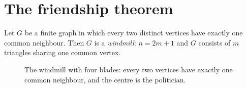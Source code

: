 \section{The friendship theorem}

\begin{theorem}\label{thm:friendship}
Let $G$ be a finite graph in which every two distinct vertices have exactly one common neighbour. Then $G$ is a
\emph{windmill}: $n=2m+1$ and $G$ consists of $m$ triangles sharing one common vertex.
\end{theorem}

\begin{figure}[ht]
\centering
{}
\caption{The windmill with four blades: every two vertices have exactly one common neighbour, and the centre is the
politician.}
\label{fig:windmill}
\end{figure}


